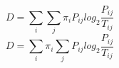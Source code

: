 \[ D = \sum_{i} \sum_{j} \pi_{i} P_{ij} log_{2} \frac{P_{ij}}{T_{ij}} \]
\[ D = \sum_{i} \pi_{i} \sum_{j} P_{ij} log_{2} \frac{P_{ij}}{T_{ij}} \]


